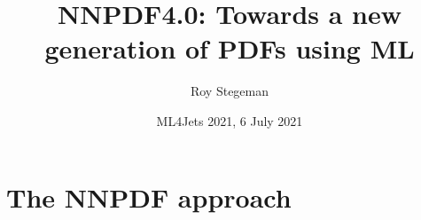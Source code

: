 \documentclass[aspectratio=169,10pt]{beamer}
\title{NNPDF4.0: Towards a new generation of PDFs using ML}
\date{ML4Jets 2021, 6 July 2021}
\author{Roy Stegeman}
\institute{University of Milan and INFN Milan}
\begin{document}
{
\begin{frame}
  \titlepage
\end{frame}
}





\section*{The NNPDF approach}


\end{document}
